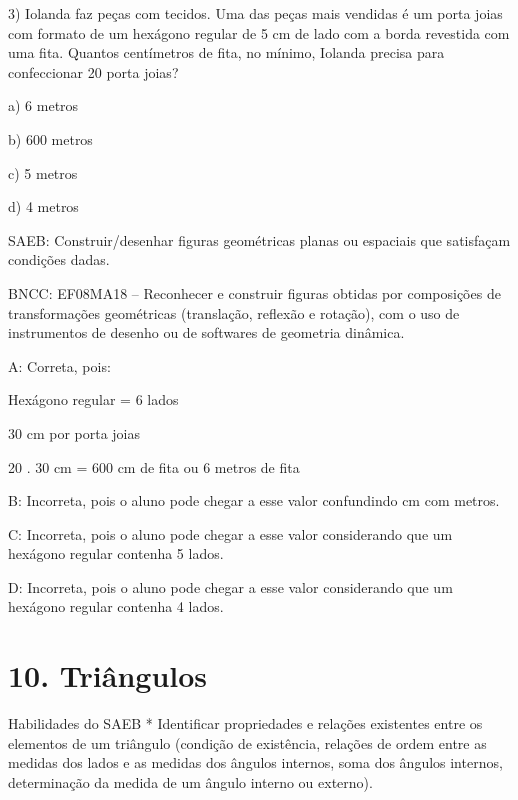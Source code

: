 3) Iolanda faz peças com tecidos. Uma das peças mais vendidas é um porta
joias com formato de um hexágono regular de 5 cm de lado com a borda
revestida com uma fita. Quantos centímetros de fita, no mínimo, Iolanda
precisa para confeccionar 20 porta joias?

a) 6 metros

b) 600 metros

c) 5 metros

d) 4 metros

SAEB: Construir/desenhar figuras geométricas planas ou espaciais que
satisfaçam condições dadas.

BNCC: EF08MA18 -- Reconhecer e construir figuras obtidas por composições
de transformações geométricas (translação, reflexão e rotação), com o
uso de instrumentos de desenho ou de softwares de geometria dinâmica.

A: Correta, pois:

Hexágono regular = 6 lados

30 cm por porta joias

20 . 30 cm = 600 cm de fita ou 6 metros de fita

B: Incorreta, pois o aluno pode chegar a esse valor confundindo cm com
metros.

C: Incorreta, pois o aluno pode chegar a esse valor considerando que um
hexágono regular contenha 5 lados.

D: Incorreta, pois o aluno pode chegar a esse valor considerando que um
hexágono regular contenha 4 lados.


\section{10. Triângulos}

Habilidades do SAEB * Identificar propriedades e relações existentes
entre os elementos de um triângulo (condição de existência, relações de
ordem entre as medidas dos lados e as medidas dos ângulos internos, soma
dos ângulos internos, determinação da medida de um ângulo interno ou
externo).

